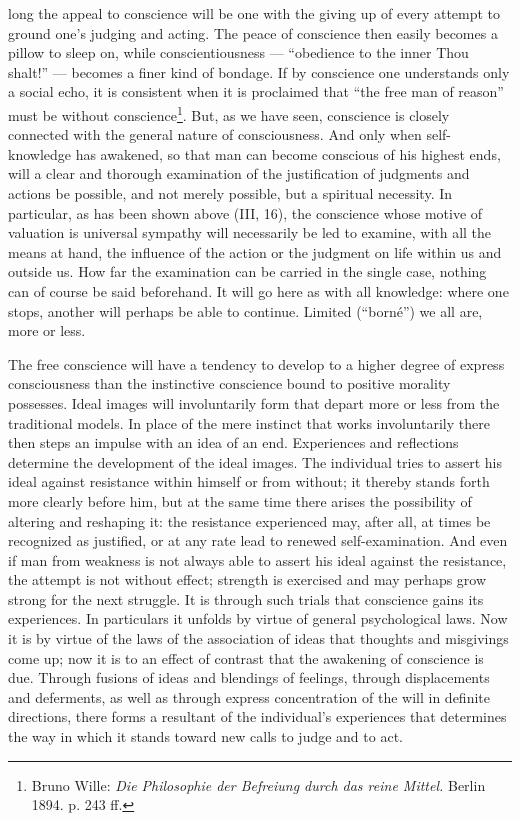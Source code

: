 \documentclass[12pt,a4paper,openany]{book}
\newcommand{\opage}[1]{\marginnote{\footnotesize\textit{[#1]}}}
\begin{document}
long the appeal to conscience will be one with the giving up of every attempt to ground one's judging and
acting. The peace of conscience then easily becomes a pillow to sleep on, while conscientiousness ---
``obedience to the inner Thou shalt!'' --- becomes a finer kind of bondage. If by conscience one
understands only a social echo, it is consistent when it is proclaimed that ``the free man of reason''
must be without conscience\footnote[3]{Bruno Wille: \textit{Die Philosophie der Befreiung durch das
reine Mittel.} Berlin 1894. p. 243 ff.}. But, as we have seen, conscience is closely connected with the
general nature of consciousness. And only when self-knowledge has awakened, so that man can become
conscious of his highest ends, will a clear and thorough
\opage{86}examination of the justification of judgments and actions be possible, and not merely possible, but
a spiritual necessity. In particular, as has been shown above (III, 16), the conscience whose motive of
valuation is universal sympathy will necessarily be led to examine, with all the means at hand, the
influence of the action or the judgment on life within us and outside us. How far the examination can be
carried in the single case, nothing can of course be said beforehand. It will go here as with all
knowledge: where one stops, another will perhaps be able to continue. Limited (``borné'') we all are,
more or less.

The free conscience will have a tendency to develop to a higher degree of express consciousness than the
instinctive conscience bound to positive morality possesses. Ideal images will involuntarily form that
depart more or less from the traditional models. In place of the mere instinct that works involuntarily
there then steps an impulse with an idea of an end. Experiences and reflections determine the
development of the ideal images. The individual tries to assert his ideal against resistance within
himself or from without; it thereby stands forth more clearly before him, but at the same time there
arises the possibility of altering and reshaping it: the resistance experienced may, after all, at times
be recognized as justified, or at any rate lead to renewed self-examination. And even if man from
weakness is not always able to assert his ideal against the resistance, the attempt is not without
effect; strength is exercised and may perhaps grow strong for the next struggle. It is through such
trials that conscience gains its experiences. In particulars it unfolds by virtue of general
psychological laws. Now it is by virtue of the laws of the association of ideas that thoughts and
misgivings come up; now it is to an effect of contrast that the awakening of conscience is due. Through
fusions of ideas and blendings of feelings, through displacements and deferments, as well as through
express concentration of the will in definite directions, there forms a resultant of the individual's
experiences that determines the way in which it stands toward new calls to judge and to act.
\end{document}

